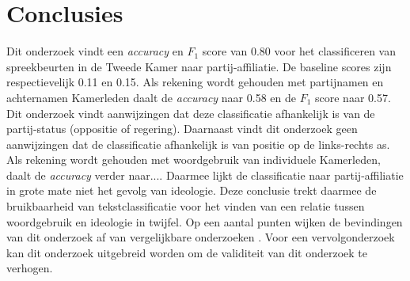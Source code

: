\section{Conclusies}
\label{sec:conc}

Dit onderzoek vindt een \textit{accuracy} en $F_1$ score van 0.80 voor het classificeren van spreekbeurten in de Tweede Kamer naar partij-affiliatie. De baseline scores zijn respectievelijk 0.11 en 0.15. Als rekening wordt gehouden met partijnamen en achternamen Kamerleden daalt de \textit{accuracy} naar 0.58 en de $F_1$ score naar 0.57. Dit onderzoek vindt aanwijzingen dat deze classificatie afhankelijk is van de partij-status (oppositie of regering). Daarnaast vindt dit onderzoek geen aanwijzingen dat de classificatie afhankelijk is van positie op de links-rechts as. Als rekening wordt gehouden met woordgebruik van individuele Kamerleden, daalt de \textit{accuracy} verder naar.... Daarmee lijkt de classificatie naar partij-affiliatie in grote mate niet het gevolg van ideologie. Deze conclusie trekt daarmee de bruikbaarheid van tekstclassificatie voor het vinden van een relatie tussen woordgebruik en ideologie in twijfel. Op een aantal punten wijken de bevindingen van dit onderzoek af van vergelijkbare onderzoeken \cite{Hirst_textto,diermeier_godbout_yu_kaufmann_2012}. Voor een vervolgonderzoek kan dit onderzoek uitgebreid worden om de validiteit van dit onderzoek te verhogen.